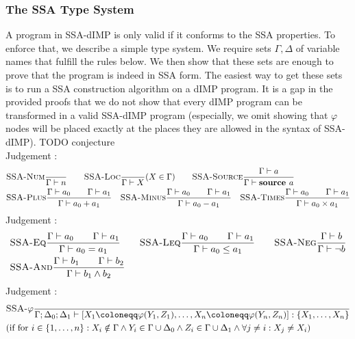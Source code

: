 \subsubsection*{The SSA Type System}
A program in SSA-dIMP is only valid if it conforms to the SSA properties.
To enforce that, we describe a simple type system.
We require sets $\Gamma, \Delta$ of variable names that fulfill the rules below.
We then show that these sets are enough to prove that the program is indeed in SSA form.
The easiest way to get these sets is to run a SSA construction algorithm on a dIMP program.
It is a gap in the provided proofs that we do not show that every dIMP program
can be transformed in a valid SSA-dIMP program (especially, we omit showing that
$\varphi$ nodes will be placed exactly at the places they are allowed in the syntax
of SSA-dIMP).
TODO conjecture
\\
Judgement :
\begin{align*}
    &\textsc{SSA-Num}\frac{\displaystyle }{\displaystyle \Gamma \vdash {n}}\qquad
    \textsc{SSA-Loc}\frac{\displaystyle }{\displaystyle \Gamma \vdash {X}}\text{($X \in \Gamma$)}\qquad
    \textsc{SSA-Source}\frac{\displaystyle \Gamma \vdash {a}}{\displaystyle \Gamma \vdash {\textbf{source }{a}}}\\
    &\textsc{SSA-Plus}\frac{\displaystyle \Gamma \vdash {a_0}\qquad\Gamma \vdash {a_1}}{\displaystyle \Gamma \vdash {a_0+a_1}}\quad
    \textsc{SSA-Minus}\frac{\displaystyle \Gamma \vdash {a_0}\qquad\Gamma \vdash {a_1}}{\displaystyle \Gamma \vdash {a_0-a_1}}\quad
    \textsc{SSA-Times}\frac{\displaystyle \Gamma \vdash {a_0}\qquad\Gamma \vdash {a_1}}{\displaystyle \Gamma \vdash {a_0 \times a_1}}
\end{align*}
Judgement :
\begin{align*}
    &\textsc{SSA-Eq}\frac{\displaystyle \Gamma \vdash {a_0}\qquad \Gamma \vdash {a_1}}{\displaystyle \Gamma \vdash {a_0 = a_1}}\qquad
    \textsc{SSA-Leq}\frac{\displaystyle \Gamma \vdash {a_0}\qquad \Gamma \vdash {a_1}}{\displaystyle \Gamma \vdash {a_0 \leq a_1}}\qquad
    \textsc{SSA-Neg}\frac{\displaystyle \Gamma \vdash {b}}{\displaystyle \Gamma \vdash {\neg b}}\\
    &\textsc{SSA-And}\frac{\displaystyle \Gamma \vdash {b_1}\qquad\Gamma \vdash {b_2}}{\displaystyle \Gamma \vdash {b_1 \land b_2}}\\
\end{align*}
Judgement :
\begin{align*}
    &\rule{SSA-$\varphi$}{}{\typestep{\Gamma;\Delta_0;\Delta_1}{\defaultphilistn}{\{X_1, \ldots, X_n\}}}\\
    &\text{(if for $i \in \{1, \ldots, n\}: X_i \notin \Gamma \land Y_i \in \Gamma \cup \Delta_0 \land Z_i \in \Gamma \cup \Delta_1
    \land \forall j \neq i: X_j \neq X_i$)}
\end{align*}
